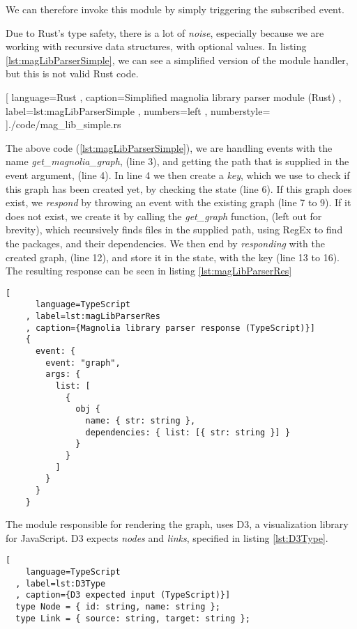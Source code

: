 We can therefore invoke this module by simply triggering the subscribed event.

Due to Rust's type safety, there is a lot of \textit{noise}, especially because
we are working with recursive data structures, with optional values. In listing
\ref{lst:magLibParserSimple}, we can see a simplified version of the module
handler, but this is not valid Rust code.

\begin{code}[H]
  
    [ language=Rust
    , caption={Simplified magnolia library parser module (Rust)}
    , label=lst:magLibParserSimple
    , numbers=left
    , numberstyle=\tiny\color{gray}
    ]{./code/mag\_lib\_simple.rs}
\end{code}

The above code (\ref{lst:magLibParserSimple}), we are handling events with the name
\textit{get\_magnolia\_graph}, (line 3), and getting the path that is supplied in
the event argument, (line 4). In line 4 we then create a \textit{key}, which we
use to check if this graph has been created yet, by checking the state (line 6).
If this graph does exist, we \textit{respond} by throwing an event with the
existing graph (line 7 to 9). If it does not exist, we create it by calling the
\textit{get\_graph} function, (left out for brevity), which recursively finds
files in the supplied path, using RegEx to find the packages, and their
dependencies. We then end by \textit{responding} with the created graph,
(line 12), and store it in the state, with the key (line 13 to 16). The
resulting response can be seen in listing \ref{lst:magLibParserRes}

\begin{code}[H]
  \begin{lstlisting}[
      language=TypeScript
    , label=lst:magLibParserRes
    , caption={Magnolia library parser response (TypeScript)}]
    {
      event: {
        event: "graph",
        args: {
          list: [
            {
              obj {
                name: { str: string },
                dependencies: { list: [{ str: string }] }
              }
            }
          ]
        }
      }
    }
  \end{lstlisting}
\end{code}

The module responsible for rendering the graph, uses D3, a visualization library
for JavaScript. D3 expects \textit{nodes} and \textit{links}, specified in
listing \ref{lst:D3Type}.

\begin{lstlisting}[
    language=TypeScript
  , label=lst:D3Type
  , caption={D3 expected input (TypeScript)}]
  type Node = { id: string, name: string };
  type Link = { source: string, target: string };
\end{lstlisting}

